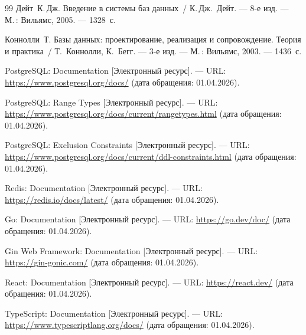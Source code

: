 \renewcommand{\bibname}{СПИСОК ИСПОЛЬЗОВАННЫХ ИСТОЧНИКОВ}

\begin{thebibliography}{99}
    Дейт~К.\,Дж. Введение в системы баз данных~/ К.\,Дж.~Дейт. --- 8-е изд. --- М.\,: Вильямс, 2005. --- 1328~с.

    Коннолли~Т. Базы данных: проектирование, реализация и сопровождение. Теория и практика~/ Т.~Коннолли, К.~Бегг. --- 3-е изд. --- М.\,: Вильямс, 2003. --- 1436~с.

    PostgreSQL: Documentation [Электронный ресурс]. --- URL: \url{https://www.postgresql.org/docs/} (дата обращения: 01.04.2026).

    PostgreSQL: Range Types [Электронный ресурс]. --- URL: \url{https://www.postgresql.org/docs/current/rangetypes.html} (дата обращения: 01.04.2026).

    PostgreSQL: Exclusion Constraints [Электронный ресурс]. --- URL: \url{https://www.postgresql.org/docs/current/ddl-constraints.html} (дата обращения: 01.04.2026).

    Redis: Documentation [Электронный ресурс]. --- URL: \url{https://redis.io/docs/latest/} (дата обращения: 01.04.2026).

    Go: Documentation [Электронный ресурс]. --- URL: \url{https://go.dev/doc/} (дата обращения: 01.04.2026).

    Gin Web Framework: Documentation [Электронный ресурс]. --- URL: \url{https://gin-gonic.com/} (дата обращения: 01.04.2026).

    React: Documentation [Электронный ресурс]. --- URL: \url{https://react.dev/} (дата обращения: 01.04.2026).

    TypeScript: Documentation [Электронный ресурс]. --- URL: \url{https://www.typescriptlang.org/docs/} (дата обращения: 01.04.2026).
\end{thebibliography}

\clearpage
